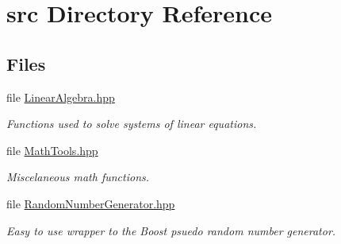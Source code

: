 \section{src Directory Reference}
\label{dir_68267d1309a1af8e8297ef4c3efbcdba}
\subsection*{Files}
\begin{DoxyCompactItemize}
\item 
file \hyperlink{LinearAlgebra_8hpp}{Linear\+Algebra.\+hpp}
\begin{DoxyCompactList}\small\item\em Functions used to solve systems of linear equations. \end{DoxyCompactList}\item 
file \hyperlink{MathTools_8hpp}{Math\+Tools.\+hpp}
\begin{DoxyCompactList}\small\item\em Miscelaneous math functions. \end{DoxyCompactList}\item 
file \hyperlink{RandomNumberGenerator_8hpp}{Random\+Number\+Generator.\+hpp}
\begin{DoxyCompactList}\small\item\em Easy to use wrapper to the Boost psuedo random number generator. \end{DoxyCompactList}\end{DoxyCompactItemize}
